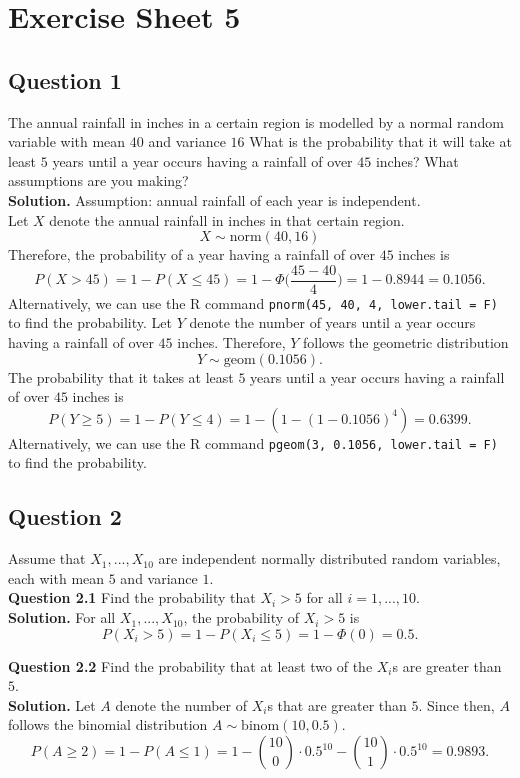 \documentclass[
]{book}
\begin{document}
\chapter{Exercise Sheet 5}\label{exercise-sheet-5}

\section{Question 1}\label{question-1-4}

The annual rainfall in inches in a certain region is modelled by a normal random variable with mean \(40\) and variance \(16\) What is the probability that it will take at least \(5\) years until a year occurs having a rainfall of over \(45\) inches? What assumptions are you making?\\
\textbf{Solution.} Assumption: annual rainfall of each year is independent.\\
Let \(X\) denote the annual rainfall in inches in that certain region. \[X \sim \text{norm}(40, 16)\]
Therefore, the probability of a year having a rainfall of over \(45\) inches is \[P(X > 45) = 1 - P(X \leq 45) = 1 - \Phi \bigg(\frac{45-40}{4}\bigg) = 1 - 0.8944 = 0.1056.\] Alternatively, we can use the R command \texttt{pnorm(45,\ 40,\ 4,\ lower.tail\ =\ F)} to find the probability. Let \(Y\) denote the number of years until a year occurs having a rainfall of over \(45\) inches. Therefore, \(Y\) follows the geometric distribution \[Y \sim \text{geom}(0.1056).\]
The probability that it takes at least \(5\) years until a year occurs having a rainfall of over \(45\) inches is
\[P(Y \geq 5) = 1 - P(Y \leq 4) = 1 - (1 - (1 - 0.1056)^4) = 0.6399.\] Alternatively, we can use the R command \texttt{pgeom(3,\ 0.1056,\ lower.tail\ =\ F)} to find the probability.

\section{Question 2}\label{question-2-4}

Assume that \(X_1, ..., X_{10}\) are independent normally distributed random variables, each with mean \(5\) and variance \(1\).\\
\textbf{Question 2.1} Find the probability that \(X_i > 5\) for all \(i = 1,...,10\).\\
\textbf{Solution.} For all \(X_1, ..., X_{10}\), the probability of \(X_i > 5\) is
\[P(X_i > 5) = 1 - P(X_i \leq 5) = 1 - \Phi(0) = 0.5.\]

\textbf{Question 2.2} Find the probability that at least two of the \(X_i\)s are greater than \(5\).\\
\textbf{Solution.} Let \(A\) denote the number of \(X_i\)s that are greater than \(5\). Since then, \(A\) follows the binomial distribution
\(A \sim \text{binom}(10, 0.5)\).
\[P(A \geq 2) = 1 - P(A \leq 1) = 1 - \binom{10}{0} \cdot 0.5^{10} - \binom{10}{1} \cdot 0.5^{10} = 0.9893.\]
\end{document}
